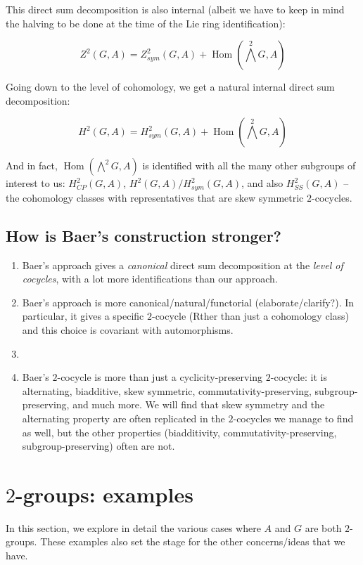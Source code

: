 \documentclass[10pt]{amsart}
\begin{document}
This direct sum decomposition is also internal (albeit we have to keep
in mind the halving to be done at the time of the Lie ring
identification):

$$Z^2(G,A) = Z^2_{sym}(G,A) + \operatorname{Hom}(\bigwedge^2G,A)$$

Going down to the level of cohomology, we get a natural internal
direct sum decomposition:

$$H^2(G,A) = H^2_{sym}(G,A) + \operatorname{Hom}(\bigwedge^2G,A)$$

And in fact, $\operatorname{Hom}(\bigwedge^2G,A)$ is identified with
all the many other subgroups of interest to us: $H^2_{CP}(G,A)$,
$H^2(G,A)/H^2_{sym}(G,A)$, and also $H^2_{SS}(G,A)$ -- the cohomology
classes with representatives that are skew symmetric $2$-cocycles.

\subsection{How is Baer's construction stronger?}

\begin{enumerate}
\item Baer's approach gives a {\em canonical} direct sum decomposition
  at the {\em level of cocycles}, with a lot more identifications than
  our approach.
\item Baer's approach is more canonical/natural/functorial
  (elaborate/clarify?). In particular, it gives a specific $2$-cocycle
  (Rther than just a cohomology class) and this choice is covariant
  with automorphisms.
\item \item Baer's $2$-cocycle is more than just a cyclicity-preserving
  $2$-cocycle: it is alternating, biadditive, skew symmetric,
  commutativity-preserving, subgroup-preserving, and much more. We
  will find that skew symmetry and the alternating property are often
  replicated in the $2$-cocycles we manage to find as well, but the
  other properties (biadditivity, commutativity-preserving,
  subgroup-preserving) often are not.
\end{enumerate}

\section{$2$-groups: examples}

In this section, we explore in detail the various cases where $A$ and
$G$ are both $2$-groups. These examples also set the stage for the
other concerns/ideas that we have.
\end{document}

